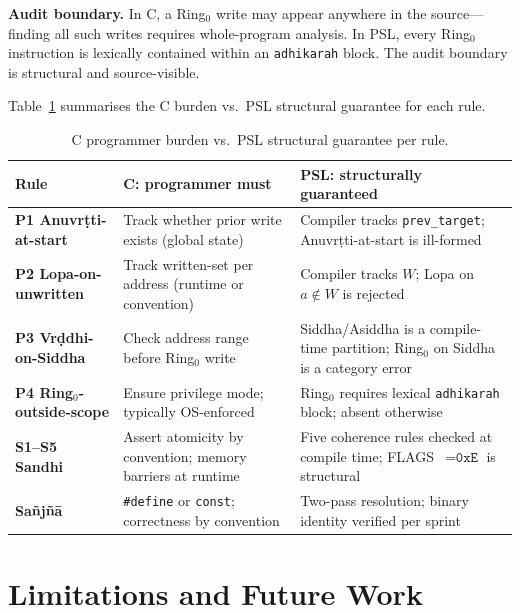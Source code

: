 \documentclass[11pt,a4paper]{article}
\begin{document}
\textbf{Audit boundary.} In C, a Ring$_0$ write may appear anywhere in the
source---finding all such writes requires whole-program analysis. In PSL, every
Ring$_0$ instruction is lexically contained within an \texttt{adhikarah}
block. The audit boundary is structural and source-visible.

Table~\ref{tab:comparison} summarises the C burden vs.\ PSL structural
guarantee for each rule.

\begin{table}[t]
\caption{C programmer burden vs.\ PSL structural guarantee per rule.}
\label{tab:comparison}
\small
\begin{tabularx}{\linewidth}{>{\bfseries}p{2.8cm} X X}
\toprule
Rule & C: programmer must & PSL: structurally guaranteed \\
\midrule
P1 Anuvr\d{t}ti-at-start
  & Track whether prior write exists (global state)
  & Compiler tracks \texttt{prev\_target}; Anuvr\d{t}ti-at-start is ill-formed \\[4pt]
P2 Lopa-on-unwritten
  & Track written-set per address (runtime or convention)
  & Compiler tracks $W$; Lopa on $a \notin W$ is rejected \\[4pt]
P3 Vr\d{d}dhi-on-Siddha
  & Check address range before Ring$_0$ write
  & Siddha/Asiddha is a compile-time partition; Ring$_0$ on Siddha is a category error \\[4pt]
P4 Ring$_0$-outside-scope
  & Ensure privilege mode; typically OS-enforced
  & Ring$_0$ requires lexical \texttt{adhikarah} block; absent otherwise \\[4pt]
S1--S5 Sandhi
  & Assert atomicity by convention; memory barriers at runtime
  & Five coherence rules checked at compile time; FLAGS~$=\texttt{0xE}$ is structural \\[4pt]
Sa\~{n}j\~{n}\={a}
  & \texttt{\#define} or \texttt{const}; correctness by convention
  & Two-pass resolution; binary identity verified per sprint \\
\bottomrule
\end{tabularx}
\end{table}

\section{Limitations and Future Work}
\label{sec:limitations}
\end{document}
